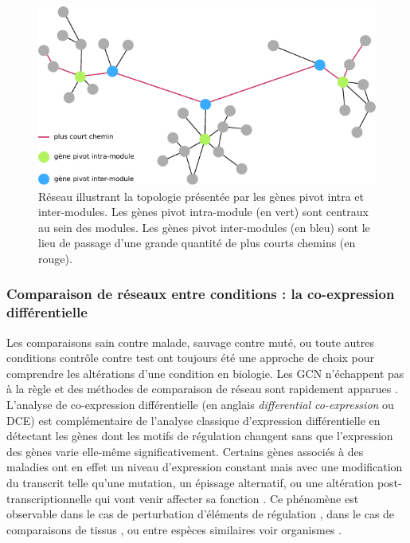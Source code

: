 \begin{figure}
    \centering
    \includegraphics{img/intro/3_coexpr/intro_3_coexpr_hub_gene.pdf}
    \caption[Réseau illustrant la topologie présentée par les gènes pivot intra et inter-modules]{Réseau illustrant la topologie présentée par les gènes pivot intra et inter-modules. Les gènes pivot intra-module (en vert) sont centraux au sein des modules. Les gènes pivot inter-modules (en bleu) sont le lieu de passage d'une grande quantité de plus courts chemins (en rouge).}
    \label{fig:hub_gene_intra_inter}
\end{figure}



\subsubsection{Comparaison de réseaux entre conditions : la co-expression différentielle}

Les comparaisons sain contre malade, sauvage contre muté, ou toute autres conditions contrôle contre test ont toujours été une approche de choix pour comprendre les altérations d'une condition en biologie. Les \acrshort{GCN} n'échappent pas à la règle et des méthodes de comparaison de réseau sont rapidement apparues \cite{Lai2004Nov}. L'analyse de co-expression différentielle (en anglais \textit{differential co-expression} ou DCE) est complémentaire de l'analyse classique d'expression différentielle en détectant les gènes dont les motifs de régulation changent sans que l'expression des gènes varie elle-même significativement. Certains gènes associés à des maladies ont en effet un niveau d'expression constant mais avec une modification du transcrit telle qu'une mutation, un épissage alternatif, ou une altération post-transcriptionnelle qui vont venir affecter sa fonction \cite{delaFuente2010Jul}. Ce phénomène est observable dans le cas de perturbation d'éléments de régulation \cite{Rotival2013}, dans le cas de comparaisons de tissus \cite{Gov2017}, ou entre espèces similaires voir organismes \cite{Chowdhury2019}.


